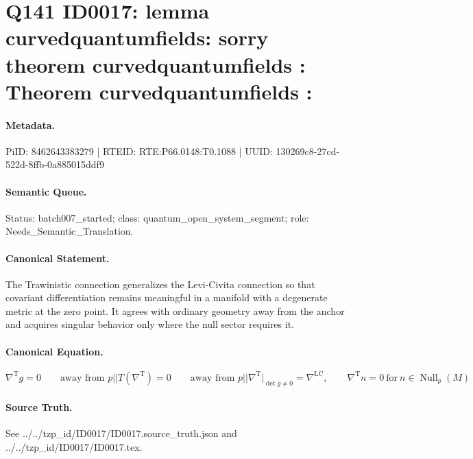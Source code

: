 \section*{Q141 ID0017: lemma curvedquantumfields: sorry theorem curvedquantumfields : Theorem curvedquantumfields :}
\paragraph{Metadata.}
PiID: 8462643383279 | RTEID: RTE:P66.0148:T0.1088 | UUID: 130269c8-27cd-522d-8ffb-0a885015ddf9

\paragraph{Semantic Queue.}
Status: batch007\_started; class: quantum\_open\_system\_segment; role: Needs\_Semantic\_Translation.

\paragraph{Canonical Statement.}
The Trawinistic connection generalizes the Levi-Civita connection so that covariant differentiation remains meaningful in a manifold with a degenerate metric at the zero point. It agrees with ordinary geometry away from the anchor and acquires singular behavior only where the null sector requires it.

\paragraph{Canonical Equation.}
\[
\nabla^{\mathrm{T}} g = 0 \qquad \text{away from } p || T(\nabla^{\mathrm{T}})=0 \qquad \text{away from } p || \nabla^{\mathrm{T}}\big\vert_{\det g \neq 0} = \nabla^{\mathrm{LC}}, \qquad \nabla^{\mathrm{T}} n = 0 \ \text{for}\ n \in \operatorname{Null}_{p}(M)
\]

\paragraph{Source Truth.}
See ../../tzp\_id/ID0017/ID0017.source\_truth.json and ../../tzp\_id/ID0017/ID0017.tex.
